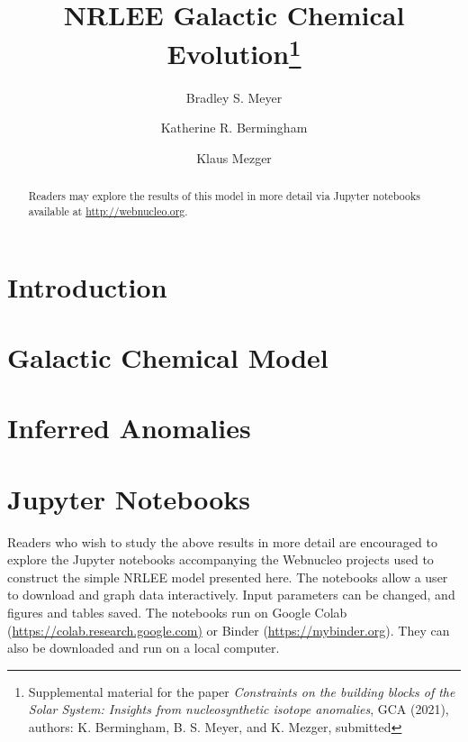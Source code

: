 \documentclass[preprint]{revtex4-2}
\begin{document}
\title{NRLEE Galactic Chemical Evolution\footnote{Supplemental material for the paper
{\it Constraints on the building blocks of the Solar System: Insights from nucleosynthetic isotope anomalies}, GCA (2021), authors: K. Bermingham,
B. S. Meyer, and K. Mezger, submitted}}
\author{Bradley S. Meyer}
\author{Katherine R. Bermingham}
\author{Klaus Mezger}

\begin{abstract}
Readers may explore the results of this model in more detail via Jupyter
notebooks available at \url{http://webnucleo.org}.
\end{abstract}

\maketitle

\section{Introduction}\label{sec:intro}

\section{Galactic Chemical Model} \label{sec:initial}

\section{Inferred Anomalies} \label{sec:polytrope}

\section{Jupyter Notebooks} \label{sec:jupyter}

Readers who wish to study the above results in 
more detail are encouraged to explore the Jupyter notebooks accompanying
the Webnucleo projects used to construct the simple NRLEE model presented
here.  The notebooks allow a user to download and graph data interactively.
Input parameters can be changed, and figures and tables saved.  The
notebooks run on Google Colab (\url{https://colab.research.google.com)} or
Binder (\url{https://mybinder.org}).  They can also be downloaded and run
on a local computer.
\end{document}

